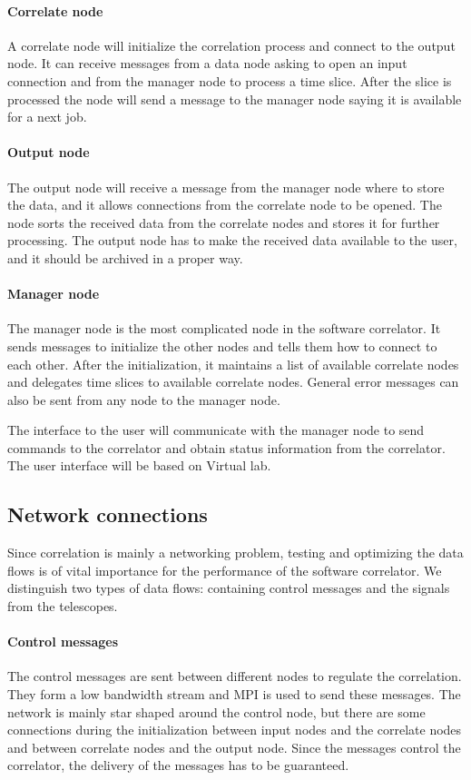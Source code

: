 \paragraph{Correlate node}
A correlate node will initialize the correlation process and connect
to the output node. It can receive messages from a data node asking to
open an input connection and from the manager node to process a
time slice. After the slice is processed the node will send a message
to the manager node saying it is available for a next job.

\paragraph{Output node}
The output node will receive a message from the manager node where
to store the data, and it allows connections from the correlate node to
be opened. The node sorts the received data from the correlate nodes
and stores it for further processing. The output node has to make the
received data available to the user, and it should be archived in a
proper way.

\paragraph{Manager node}
The manager node is the most complicated node in the software
correlator. It sends messages to initialize the other nodes and tells
them how to connect to each other. After the initialization, it
maintains a list of available correlate nodes and delegates time
slices to available correlate nodes. General error messages can also
be sent from any node to the manager node.

The interface to the user will communicate with the manager node to
send commands to the correlator and obtain status information from the
correlator. The user interface will be based on Virtual lab.

\subsection{Network connections}
Since correlation is mainly a networking problem, testing and
optimizing the data flows is of vital importance for the performance
of the software correlator. We distinguish two types of data flows:
containing control messages and the signals from the telescopes. 

\paragraph{Control messages}
The control messages are sent between different nodes to regulate the
correlation. They form a low bandwidth stream and MPI is used to send
these messages. The network is mainly star shaped around the control
node, but there are some connections during the initialization between
input nodes and the correlate nodes and between correlate nodes and
the output node. Since the messages control the correlator, the
delivery of the messages has to be guaranteed.
